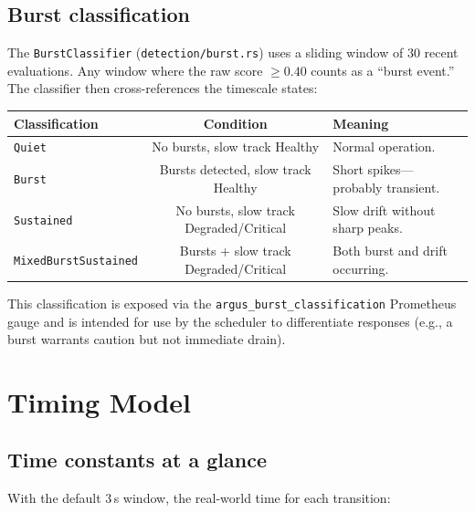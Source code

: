 \documentclass[11pt]{article}
\begin{document}
\subsection{Burst classification}

The \texttt{BurstClassifier} (\texttt{detection/burst.rs}) uses a sliding
window of 30 recent evaluations. Any window where the raw score $\geq 0.40$
counts as a ``burst event.'' The classifier then cross-references the
timescale states:

\begin{center}
\begin{tabular}{lcp{7cm}}
\toprule
Classification & Condition & Meaning \\
\midrule
\texttt{Quiet}              & No bursts, slow track Healthy & Normal operation. \\
\texttt{Burst}              & Bursts detected, slow track Healthy & Short spikes---probably transient. \\
\texttt{Sustained}          & No bursts, slow track Degraded/Critical & Slow drift without sharp peaks. \\
\texttt{MixedBurstSustained}& Bursts + slow track Degraded/Critical & Both burst and drift occurring. \\
\bottomrule
\end{tabular}
\end{center}

This classification is exposed via the
\texttt{argus\_burst\_classification} Prometheus gauge and is intended for
use by the scheduler to differentiate responses (e.g., a burst warrants
caution but not immediate drain).

\section{Timing Model}
\label{sec:timing}

\subsection{Time constants at a glance}

With the default 3\,s window, the real-world time for each transition:
\end{document}
